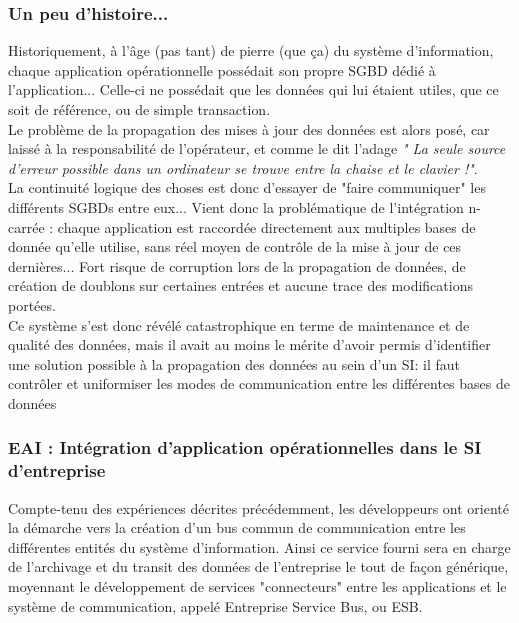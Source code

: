 \subsubsection{ Un peu d'histoire...}

Historiquement, à l'âge (pas tant) de pierre (que ça) du système d'information, chaque application opérationnelle possédait son propre SGBD dédié à l'application... Celle-ci ne possédait que les données qui lui étaient utiles, que ce soit de référence, ou de simple transaction.\\
Le problème de la propagation des mises à jour des données est alors posé, car laissé à la responsabilité de l'opérateur, et comme le dit l'adage \textit{" La seule source d'erreur possible dans un ordinateur se trouve entre la chaise et le clavier !"}.\\
La continuité logique des choses est donc d'essayer de "faire communiquer" les différents SGBDs entre eux... Vient donc la problématique de l'intégration n-carrée : chaque application est raccordée directement aux multiples bases de donnée qu'elle utilise, sans réel moyen de contrôle de la mise à jour de ces dernières... Fort risque de corruption lors de la propagation de données, de création de doublons sur certaines entrées et aucune trace des modifications portées. \\
Ce système s'est donc révélé catastrophique en terme de maintenance et de qualité des données, mais il avait au moins le mérite d'avoir permis d'identifier une solution possible à la propagation des données au sein d'un SI: il faut contrôler et uniformiser les modes de communication entre les différentes bases de données\\

\subsubsection{ EAI : Intégration d'application opérationnelles dans le SI d'entreprise}

Compte-tenu des expériences décrites précédemment, les développeurs ont orienté la démarche vers la création d'un bus commun de communication entre les différentes  entités du système d'information. Ainsi ce service fourni sera en charge de l'archivage et du transit des données de l'entreprise le tout de façon générique, moyennant le développement de services "connecteurs" entre les applications et le système de communication, appelé Entreprise Service Bus, ou ESB.\\

